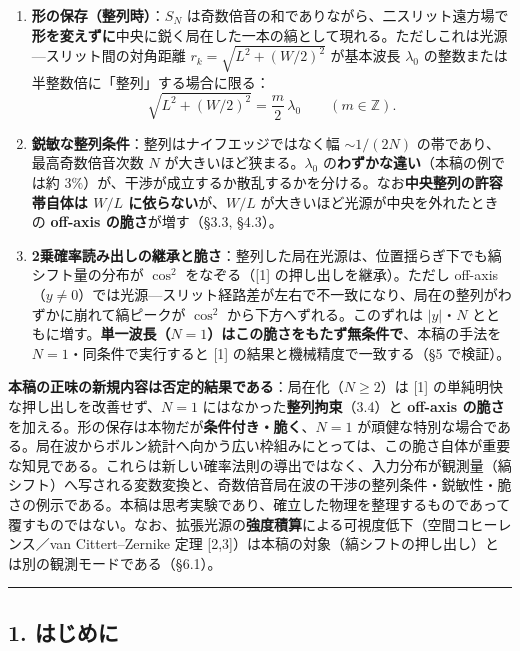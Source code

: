 \documentclass[
]{ltjsarticle}
\providecommand{\tightlist}{%
  \setlength{\itemsep}{0pt}\setlength{\parskip}{0pt}}
\begin{document}
\begin{enumerate}
\def\labelenumi{\arabic{enumi}.}
\tightlist
\item
  \textbf{形の保存（整列時）}：\(S_N\)
  は奇数倍音の和でありながら、二スリット遠方場で\textbf{形を変えずに}中央に鋭く局在した一本の縞として現れる。ただしこれは光源---スリット間の対角距離
  \(r_k=\sqrt{L^2+(W/2)^2}\) が基本波長 \(\lambda_0\)
  の整数または半整数倍に「整列」する場合に限る：
  \[\sqrt{L^{2}+(W/2)^{2}}=\frac{m}{2}\,\lambda_0\qquad(m\in\mathbb{Z}).\]
\item
  \textbf{鋭敏な整列条件}：整列はナイフエッジではなく幅 \(\sim 1/(2N)\)
  の帯であり、最高奇数倍音次数 \(N\) が大きいほど狭まる。\(\lambda_0\)
  の\textbf{わずかな違い}（本稿の例では約
  \(3\%\)）が、干渉が成立するか散乱するかを分ける。なお\textbf{中央整列の許容帯自体は
  \(W/L\) に依らない}が、\(W/L\) が大きいほど光源が中央を外れたときの
  \textbf{off-axis の脆さ}が増す（§3.3, §4.3）。
\item
  \textbf{2乗確率読み出しの継承と脆さ}：整列した局在光源は、位置揺らぎ下でも縞シフト量の分布が
  \(\cos^2\) をなぞる（{[}1{]} の押し出しを継承）。ただし
  off-axis（\(y\neq0\)）では光源---スリット経路差が左右で不一致になり、局在の整列がわずかに崩れて縞ピークが
  \(\cos^2\) から下方へずれる。このずれは \(|y|\)・\(N\)
  とともに増す。\textbf{単一波長（\(N=1\)）はこの脆さをもたず無条件で}、本稿の手法を
  \(N=1\)・同条件で実行すると {[}1{]} の結果と機械精度で一致する（§5
  で検証）。
\end{enumerate}

\textbf{本稿の正味の新規内容は否定的結果である}：局在化（\(N\ge2\)）は
{[}1{]} の単純明快な押し出しを改善せず、\(N=1\)
にはなかった\textbf{整列拘束}（3.4）と \textbf{off-axis
の脆さ}を加える。形の保存は本物だが\textbf{条件付き・脆く}、\(N=1\)
が頑健な特別な場合である。局在波からボルン統計へ向かう広い枠組みにとっては、この脆さ自体が重要な知見である。これらは新しい確率法則の導出ではなく、入力分布が観測量（縞シフト）へ写される変数変換と、奇数倍音局在波の干渉の整列条件・鋭敏性・脆さの例示である。本稿は思考実験であり、確立した物理を整理するものであって覆すものではない。なお、拡張光源の\textbf{強度積算}による可視度低下（空間コヒーレンス／van
Cittert--Zernike 定理
{[}2,3{]}）は本稿の対象（縞シフトの押し出し）とは別の観測モードである（§6.1）。

\begin{center}\rule{0.5\linewidth}{0.5pt}\end{center}

\subsection{1. はじめに}\label{ux306fux3058ux3081ux306b}
\end{document}
